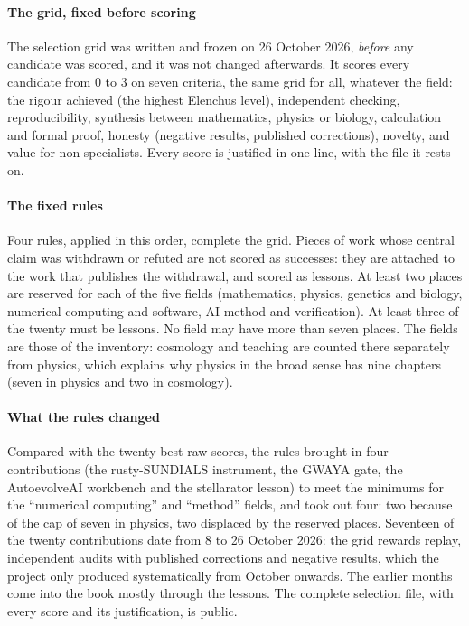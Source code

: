 \paragraph{The grid, fixed before scoring} The selection grid was written and frozen on 26 October 2026, \emph{before}
any candidate was scored, and it was not changed afterwards. It scores every candidate from 0 to 3 on seven criteria,
the same grid for all, whatever the field: the rigour achieved (the highest Elenchus level), independent checking,
reproducibility, synthesis between mathematics, physics or biology, calculation and formal proof, honesty (negative
results, published corrections), novelty, and value for non-specialists. Every score is justified in one line, with
the file it rests on.

\paragraph{The fixed rules} Four rules, applied in this order, complete the grid. Pieces of work whose central claim was
withdrawn or refuted are not scored as successes: they are attached to the work that publishes the withdrawal, and
scored as lessons. At least two places are reserved for each of the five fields (mathematics, physics, genetics and
biology, numerical computing and software, AI method and verification). At least three of the twenty must be lessons.
No field may have more than seven places. The fields are those of the inventory: cosmology and teaching are counted
there separately from physics, which explains why physics in the broad sense has nine chapters (seven in physics and
two in cosmology).

\paragraph{What the rules changed} Compared with the twenty best raw scores, the rules brought in four contributions
(the rusty-SUNDIALS instrument, the GWAYA gate, the AutoevolveAI workbench and the stellarator lesson) to meet the
minimums for the ``numerical computing'' and ``method'' fields, and took out four: two because of the cap of seven in
physics, two displaced by the reserved places. Seventeen of the twenty contributions date from 8 to 26 October 2026:
the grid rewards replay, independent audits with published corrections and negative results, which the project only
produced systematically from October onwards. The earlier months come into the book mostly through the lessons. The
complete selection file, with every score and its justification, is public.

